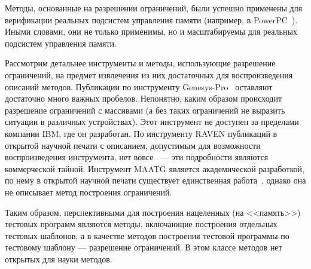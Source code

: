 Методы, основанные на разрешении ограничений, были успешно применены для верификации реальных подсистем управления памяти (например, в PowerPC~\cite{GenesysPro}). Иными словами, они не только применимы, но и масштабируемы для реальных подсистем управления памяти.



Рассмотрим детальнее инструменты и методы, использующие разрешение ограничений, на предмет извлечения из них достаточных для воспроизведения описаний методов. Публикации по инструменту Genesys-Pro~\cite{GenesysPro, GenesysPro2004Innovations, GenesysSolver} оставляют достаточно много важных пробелов. Непонятно, каким образом происходит разрешение ограничений с массивами (а без таких ограничений не выразить ситуации в различных устройствах). Этот инструмент не доступен за пределами компании IBM, где он разработан. По инструменту RAVEN публикаций в открытой научной печати с описанием, допустимым для возможности воспроизведения инструмента, нет вовсе~\cite{RAVEN} --- эти подробности являются коммерческой тайной. Инструмент MAATG является академической разработкой, по нему в открытой научной печати существует единственная работа~\cite{MAATG}, однако она не описывает метод построения ограничений.

Таким образом, перспективными для построения нацеленных (на <<память>>) тестовых программ являются  методы, включающие построения отдельных тестовых шаблонов, а в качестве методов построения тестовой программы по тестовому шаблону --- разрешение ограничений. В этом классе методов нет открытых для науки методов.


